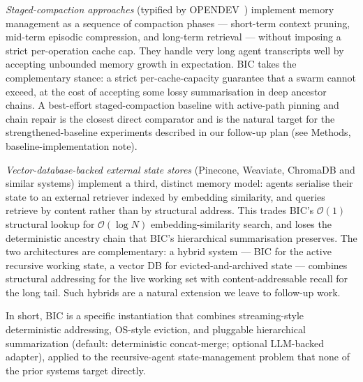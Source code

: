 \documentclass[fleqn,10pt]{article}
\theoremstyle{definition}
\newcommand{\Oh}{\mathcal{O}}
\begin{document}
\emph{Staged-compaction approaches} (typified by
OPENDEV~\citep{opendev2025}) implement memory management as a
sequence of compaction phases --- short-term context pruning,
mid-term episodic compression, and long-term retrieval --- without
imposing a strict per-operation cache cap. They handle very long
agent transcripts well by accepting unbounded memory growth in
expectation. BIC takes the complementary stance: a strict
per-cache-capacity guarantee that a swarm cannot exceed, at the
cost of accepting some lossy summarisation in deep ancestor chains.
A best-effort staged-compaction baseline with active-path pinning
and chain repair is the closest direct comparator and is the
natural target for the strengthened-baseline experiments described
in our follow-up plan (see Methods, baseline-implementation note).

\emph{Vector-database-backed external state stores}
(Pinecone, Weaviate, ChromaDB and similar systems) implement a third,
distinct memory model: agents serialise their state to an external
retriever indexed by embedding similarity, and queries retrieve by
content rather than by structural address. This trades BIC's
$\Oh(1)$ structural lookup for $\Oh(\log N)$ embedding-similarity
search, and loses the deterministic ancestry chain that BIC's
hierarchical summarisation preserves. The two architectures are
complementary: a hybrid system --- BIC for the active recursive
working state, a vector DB for evicted-and-archived state ---
combines structural addressing for the live working set with
content-addressable recall for the long tail. Such hybrids are a
natural extension we leave to follow-up work.

In short, BIC is a specific instantiation that combines streaming-style
deterministic addressing, OS-style eviction, and pluggable
hierarchical summarization (default: deterministic concat-merge;
optional LLM-backed adapter), applied to the recursive-agent
state-management problem that none of the prior systems target
directly.
\end{document}

